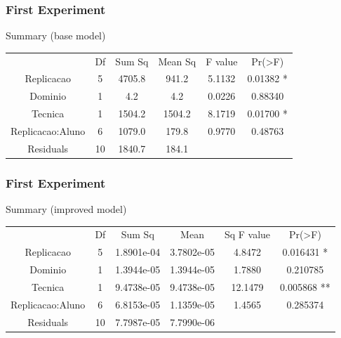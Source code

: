 \documentclass{beamer}
\begin{document}
\begin{frame}
\frametitle{First Experiment}
\begin{block}{Summary (base model)}
\begin{scriptsize}
\begin{table}[htbp]
  \centering
  \begin{tabular}{@{} cccccc @{}}
                             	& Df    	& Sum Sq   	& Mean Sq  	& F value    	&  Pr(>F)  	\\
Replicacao            	& 5     	& 4705.8    	& 941.2        	& 5.1132     	&  0.01382 *	\\
Dominio                	& 1      	& 4.2           	& 4.2            	& 0.0226   	&  0.88340  	\\
Tecnica                 	& 1     	& 1504.2     	& 1504.2      	& 8.1719    	&  0.01700 *	\\
Replicacao:Aluno  	& 6     	& 1079.0     	& 179.8        	& 0.9770    	&  0.48763  	\\
Residuals              	& 10   	& 1840.7     	& 184.1   		&			&			\\
\end{tabular}
\end{table}
\end{scriptsize}
\end{block} 
\end{frame}

\begin{frame}
\frametitle{First Experiment}
\begin{block}{Summary (improved model)}
\begin{scriptsize}
\begin{table}[htbp]
  \centering
  \begin{tabular}{@{} cccccc @{}}
                 		& Df     	& Sum Sq    	& Mean 		& Sq F value   	& Pr(>F)   		\\
Replicacao     		& 5 		& 1.8901e-04 	& 3.7802e-05  	& 4.8472 		& 0.016431 * 		\\
Dominio         		& 1 		& 1.3944e-05 	& 1.3944e-05   & 1.7880 		& 0.210785   		\\
Tecnica           		& 1 		& 9.4738e-05 	& 9.4738e-05   & 12.1479 	&  0.005868 **		\\
Replicacao:Aluno  	& 6 		& 6.8153e-05 	& 1.1359e-05   & 1.4565 		& 0.285374   		\\
Residuals        		& 10 	& 7.7987e-05 	& 7.7990e-06   &			&    				\\
\end{tabular}
\end{table}
\end{scriptsize}
\end{block} 
\end{frame}
\end{document}
